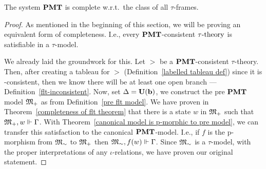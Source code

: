 
\begin{theorem}
    The system $\textbf{PMT}$ is complete w.r.t.\ the class of all $\tau$-frames.
\end{theorem}

\begin{proof}
    As mentioned in the beginning of this section, we will be proving an equivalent form of completeness. I.e., every $\textbf{PMT}$-consistent $\tau\text{-theory}$ is satisfiable in a $\tau$-model.
    \par We already laid the groundwork for this. Let $\gt$ be a $\textbf{PMT}$-consistent $\tau$-theory. Then, after creating a tableau for $\gt$ (Definition~\ref{labelled tableau def}) since it is \pmt-consistent, then we know there will be at least one open branch  --- Definition~\ref{flt-inconsistent}. Now, set $\Delta=\textbf{U}(\textbf{b})$, we construct the pre $\textbf{PMT}$ model ${\mathfrak{M}_+}$ as from Definition~\ref{pre flt model}. We have proven in Theorem~\ref{completeness of flt theorem} that there is a state $w$ in ${\mathfrak{M}_+}$ such that ${\mathfrak{M}_+},w\Vdash\Gamma$. With Theorem~\ref{canonical model is p-morphic to pre model}, we can transfer this satisfaction to the canonical $\textbf{PMT}$-model. I.e., if $f$ is the p-morphism from ${\mathfrak{M}_\sim}$ to ${\mathfrak{M}_+}$ then ${\mathfrak{M}_\sim},f(w)\Vdash\Gamma$. Since ${\mathfrak{M}_\sim}$ is a $\tau$-model, with the proper interpretations of any $\iota$-relations, we have proven our original statement.
\end{proof}




